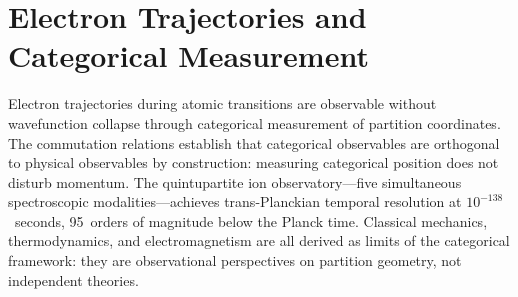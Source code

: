 \chapter{Electron Trajectories and Categorical Measurement}
\label{ch:electron_trajectories}


\begin{chapterabstract}
Electron trajectories during atomic transitions are observable without wavefunction collapse through categorical measurement of partition coordinates. The commutation relations establish that categorical observables are orthogonal to physical observables by construction: measuring categorical position does not disturb momentum. The quintupartite ion observatory---five simultaneous spectroscopic modalities---achieves trans-Planckian temporal resolution at $10^{-138}$~seconds, 95~orders of magnitude below the Planck time. Classical mechanics, thermodynamics, and electromagnetism are all derived as limits of the categorical framework: they are observational perspectives on partition geometry, not independent theories.
\end{chapterabstract}


